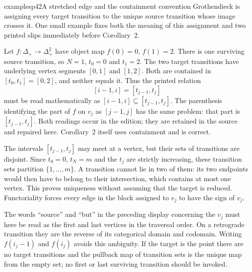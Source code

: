 \begin{dcomment}{examples}{p42}{A stretched edge and the containment convention}
Grothendieck is assigning every target transition to the unique source transition whose image crosses it. One small example fixes both the meaning of this assignment and two printed slips immediately before Corollary~2.

Let $f:\Delta_+\to\Delta_+^2$ have object map $f(0)=0$, $f(1)=2$. There is one surviving source transition, so $N=1$, $t_0=0$ and $t_1=2$. The two target transitions have underlying vertex segments $[0,1]$ and $[1,2]$. Both are contained in $[t_0,t_1]=[0,2]$, and neither equals it. Thus the printed relation
\[
 [i-1,i]=[t_{j-1},t_j]
\]
must be read mathematically as $[i-1,i]\subseteq[t_{j-1},t_j]$. The parenthesis identifying the part of $f$ on $v_j$ as $[j-1,j]$ has the same problem: that part is $[t_{j-1},t_j]$. Both readings occur in the edition; they are retained in the source and repaired here. Corollary~2 itself uses containment and is correct.

The intervals $[t_{j-1},t_j]$ may meet at a vertex, but their sets of transitions are disjoint. Since $t_0=0$, $t_N=m$ and the $t_j$ are strictly increasing, these transition sets partition $\{1,\ldots,m\}$. A transition cannot lie in two of them: its two endpoints would then have to belong to their intersection, which contains at most one vertex. This proves uniqueness without assuming that the target is reduced. Functoriality forces every edge in the block assigned to $v_j$ to have the sign of $v_j$.

The words ``source'' and ``but'' in the preceding display concerning the $v_j$ must here be read as the first and last vertices in the traversal order. On a retrograde transition they are the reverse of its categorical domain and codomain. Writing $f(i_j-1)$ and $f(i_j)$ avoids this ambiguity. If the target is the point there are no target transitions and the pullback map of transition sets is the unique map from the empty set; no first or last surviving transition should be invoked.
\end{dcomment}


